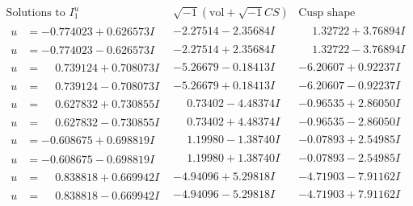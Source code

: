 \documentclass[1p]{elsarticle_modified}
\theoremstyle{definition}
\newcommand{\I}{\sqrt{-1}}
\begin{document}
$$\begin{array}{c|c|c}  
\text{Solutions to }I^u_{1}& \I (\text{vol} + \sqrt{-1}CS) & \text{Cusp shape}\\
 \hline 
\begin{aligned}
u &= -0.774023 + 0.626573 I\end{aligned}
 & -2.27514 - 2.35684 I & \phantom{-}1.32722 + 3.76894 I \\ \hline\begin{aligned}
u &= -0.774023 - 0.626573 I\end{aligned}
 & -2.27514 + 2.35684 I & \phantom{-}1.32722 - 3.76894 I \\ \hline\begin{aligned}
u &= \phantom{-}0.739124 + 0.708073 I\end{aligned}
 & -5.26679 - 0.18413 I & -6.20607 + 0.92237 I \\ \hline\begin{aligned}
u &= \phantom{-}0.739124 - 0.708073 I\end{aligned}
 & -5.26679 + 0.18413 I & -6.20607 - 0.92237 I \\ \hline\begin{aligned}
u &= \phantom{-}0.627832 + 0.730855 I\end{aligned}
 & \phantom{-}0.73402 - 4.48374 I & -0.96535 + 2.86050 I \\ \hline\begin{aligned}
u &= \phantom{-}0.627832 - 0.730855 I\end{aligned}
 & \phantom{-}0.73402 + 4.48374 I & -0.96535 - 2.86050 I \\ \hline\begin{aligned}
u &= -0.608675 + 0.698819 I\end{aligned}
 & \phantom{-}1.19980 - 1.38740 I & -0.07893 + 2.54985 I \\ \hline\begin{aligned}
u &= -0.608675 - 0.698819 I\end{aligned}
 & \phantom{-}1.19980 + 1.38740 I & -0.07893 - 2.54985 I \\ \hline\begin{aligned}
u &= \phantom{-}0.838818 + 0.669942 I\end{aligned}
 & -4.94096 + 5.29818 I & -4.71903 - 7.91162 I \\ \hline\begin{aligned}
u &= \phantom{-}0.838818 - 0.669942 I\end{aligned}
 & -4.94096 - 5.29818 I & -4.71903 + 7.91162 I \\ \hline\begin{aligned}

\end{aligned}
\end{array}$$
\end{document}
